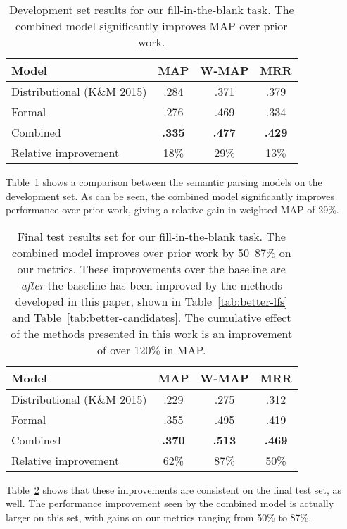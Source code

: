 \documentclass[11pt,letterpaper]{article}
\newcommand{\tabref}[1]{Table~\ref{tab:#1}}
\begin{document}
\begin{table}
\centering
{\small
\begin{tabular}{lccc}
\toprule
Model & MAP & W-MAP & MRR \\
\midrule
Distributional (K\&M 2015) & .284 & .371 & .379 \\
Formal & .276 & .469 & .334 \\
Combined & \textbf{.335} & \textbf{.477} & \textbf{.429} \\
\midrule
Relative improvement & 18\% & 29\% & 13\% \\
\bottomrule
\end{tabular}
}
\caption{Development set results for our fill-in-the-blank task.  The combined model
significantly improves MAP over prior work.}
\label{tab:dev-results}
\end{table}

\tabref{dev-results} shows a comparison between the semantic parsing models on the development set.
As can be seen, the combined model significantly improves performance over prior work, giving a
relative gain in weighted MAP of 29\%.

\begin{table}
\centering
{\small
\begin{tabular}{lccc}
\toprule
Model & MAP & W-MAP & MRR \\
\midrule
Distributional (K\&M 2015) & .229 & .275 & .312 \\
Formal & .355 & .495 & .419 \\
Combined & \textbf{.370} & \textbf{.513} & \textbf{.469} \\
\midrule
Relative improvement & 62\% & 87\% & 50\% \\
\bottomrule
\end{tabular}
}
\caption{Final test results set for our fill-in-the-blank task.  The combined model improves over
prior work by 50--87\% on our metrics.  These improvements over the baseline are \emph{after} the
baseline has been improved by the methods developed in this paper, shown in \tabref{better-lfs}
and \tabref{better-candidates}.  The cumulative effect of the methods presented in this work is
an improvement of over 120\% in MAP.}
\label{tab:final-results}
\end{table}

\tabref{final-results} shows that these improvements are consistent on the final test set, as well.
The performance improvement seen by the combined model is actually larger on this set, with gains
on our metrics ranging from 50\% to 87\%.
\end{document}
